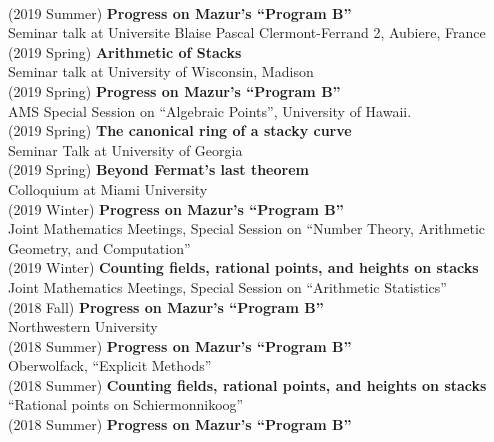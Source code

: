 \documentclass[margin,line]{res}
\begin{document}
\begin{resume}
\\
(2019 Summer) \textbf{Progress on Mazur's ``Program B''}\\  
Seminar talk at Universite Blaise Pascal Clermont-Ferrand 2, Aubiere, France
\vspace{.05cm}\\
(2019 Spring) \textbf{Arithmetic of Stacks}\\  
Seminar talk at  University of Wisconsin, Madison
\vspace{.05cm}\\
(2019 Spring) \textbf{Progress on Mazur's ``Program B''}\\  
AMS Special Session on ``Algebraic Points'', University of Hawaii.
\vspace{.05cm}\\
(2019 Spring) \textbf{The canonical ring of a stacky curve}\\  
Seminar Talk at University of Georgia
\vspace{.05cm}\\
(2019 Spring) \textbf{Beyond Fermat's last theorem}\\
Colloquium at Miami University 
\vspace{.05cm}\\
(2019 Winter) \textbf{Progress on Mazur's ``Program B''}\\  
Joint Mathematics Meetings, Special Session on ``Number Theory, Arithmetic Geometry, and Computation''
\vspace{.05cm}\\
(2019 Winter) \textbf{Counting fields, rational points, and heights on stacks}\\
Joint Mathematics Meetings, Special Session on ``Arithmetic Statistics''
\vspace{.05cm}\\
(2018 Fall) \textbf{Progress on Mazur's ``Program B''}\\  
Northwestern University
\vspace{.05cm}\\
(2018 Summer) \textbf{Progress on Mazur's ``Program B''}\\  
Oberwolfack, ``Explicit Methods''
\vspace{.05cm}\\
(2018 Summer) \textbf{Counting fields, rational points, and heights on stacks}\\
``Rational points on Schiermonnikoog''
\vspace{.05cm}\\
(2018 Summer) \textbf{Progress on Mazur's ``Program B''}\\  

\end{resume}
\end{document}
